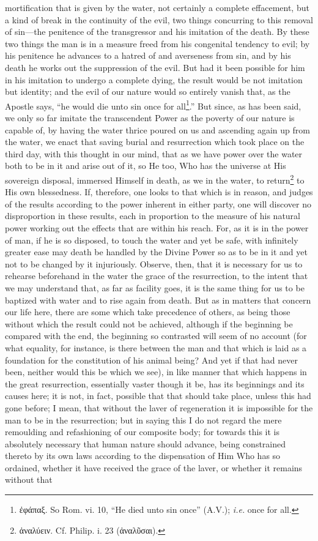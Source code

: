 mortification that is given by the water, not certainly a complete effacement, but a kind of break in the continuity of the evil, two things concurring to this removal of sin—the penitence of the transgressor and his imitation of the death. By these two things the man is in a measure freed from his congenital tendency to evil; by his penitence he advances to a hatred of and averseness from sin, and by his death he works out the suppression of the evil. But had it been possible for him in his imitation to undergo a complete dying, the result would be not imitation but identity; and the evil of our nature would so entirely vanish that, as the Apostle says, “he would die unto sin once for all\footnote{\textgreek{ἐφάπαξ}. So Rom. vi. 10, “He died unto sin once” (A.V.); \emph{i.e.} once for all.}.” But since, as has been said, we only so far imitate the transcendent Power as the poverty of our nature is capable of, by having the water thrice poured on us and ascending again up from the water, we enact that saving burial and resurrection which took place on the third day, with this thought in our mind, that as we have power over the water both to be in it and arise out of it, so He too, Who has the universe at His sovereign disposal, immersed Himself in death, as we in the water, to return\footnote{\textgreek{ἀναλύειν}. Cf. Philip. i. 23 (\textgreek{ἀναλῦσαι}).} to His own blessedness. If, therefore, one looks to that which is in reason, and judges of the results according to the power inherent in either party, one will discover no disproportion in these results, each in proportion to the measure of his natural power working out the effects that are within his reach. For, as it is in the power of man, if he is so disposed, to touch the water and yet be safe, with infinitely greater ease may death be handled by the Divine Power so as to be in it and yet not to be changed by it injuriously. Observe, then, that it is necessary for us to rehearse beforehand in the water the grace of the resurrection, to the intent that we may understand that, as far as facility goes, it is the same thing for us to be baptized with water and to rise again from death. But as in matters that concern our life here, there are some which take precedence of others, as being those without which the result could not be achieved, although if the beginning be compared with the end, the beginning so contrasted will seem of no account (for what equality, for instance, is there between the man and that which is laid as a foundation for the constitution of his animal being? And yet if that had never been, neither would this be which we see), in like manner that which happens in the great resurrection, essentially vaster though it be, has its beginnings and its causes here; it is not, in fact, possible that that should take place, unless this had gone before; I mean, that without the laver of regeneration it is impossible for the man to be in the resurrection; but in saying this I do not regard the mere remoulding and refashioning of our composite body; for towards this it is absolutely necessary that human nature should advance, being constrained thereto by its own laws according to the dispensation of Him Who has so ordained, whether it have received the grace of the laver, or whether it remains without that 